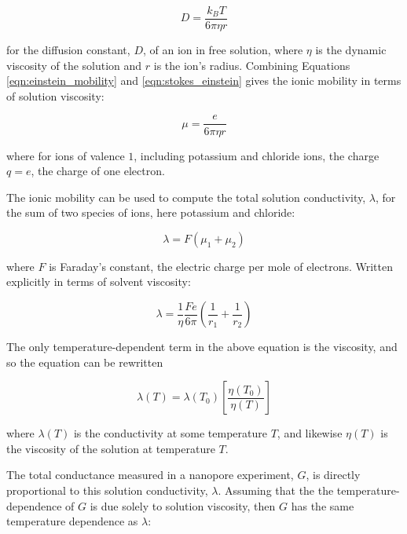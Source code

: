 \begin{equation}
D = \frac{k_B T}{6\pi\eta r}
\label{eqn:stokes_einstein}
\end{equation}

\noindent
for the diffusion constant, $D$, of an ion in free solution, where $\eta$ is the dynamic viscosity of the solution and $r$ is the ion's radius.  Combining Equations \ref{eqn:einstein_mobility} and \ref{eqn:stokes_einstein} gives the ionic mobility in terms of solution viscosity:

\begin{equation}
\mu = \frac{e}{6 \pi \eta r}
\label{eqn:mobility}
\end{equation}

\noindent
where for ions of valence $1$, including potassium and chloride ions, the charge $q=e$, the charge of one electron.

The ionic mobility can be used to compute the total solution conductivity, $\lambda$, for the sum of two species of ions, here potassium and chloride:

\begin{equation}
\lambda = F(\mu_1 + \mu_2)
\label{eqn:conductivity}
\end{equation}

\noindent
where $F$ is Faraday's constant, the electric charge per mole of electrons.  Written explicitly in terms of solvent viscosity:

\begin{equation}
\lambda = \frac{1}{\eta} \frac{Fe}{6\pi} \left( \frac{1}{r_1}+\frac{1}{r_2} \right)
\label{eqn:conductivity_eta}
\end{equation}

The only temperature-dependent term in the above equation is the viscosity, and so the equation can be rewritten

\begin{equation}
\lambda(T) = \lambda(T_0) \left[ \frac{\eta(T_0)}{\eta(T)} \right]
\label{eqn:conductivity_temp}
\end{equation}

\noindent
where $\lambda(T)$ is the conductivity at some temperature $T$, and likewise $\eta(T)$ is the viscosity of the solution at temperature $T$.

The total conductance measured in a nanopore experiment, $G$, is directly proportional to this solution conductivity, $\lambda$.  Assuming that the the temperature-dependence of $G$ is due solely to solution viscosity, then $G$ has the same temperature dependence as $\lambda$:

